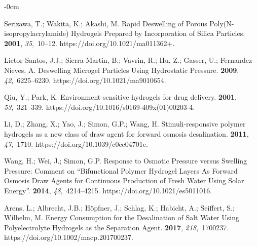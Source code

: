 \documentclass[gels,article,accept,pdftex,moreauthors]{Definitions/mdpi}
\begin{document}
\begin{adjustwidth}{-\extralength}{0cm}
\begin{thebibliography}{999}
Serizawa, T.; Wakita, K.; Akashi, M.
\newblock Rapid Deswelling of Porous Poly(N-isopropylacrylamide) Hydrogels
  Prepared by Incorporation of Silica Particles.
 {\bf 2001}, {\em 35},~10--12.
\newblock
  https://doi.org/10.1021/ma011362+.%

Lietor-Santos, J.J.; Sierra-Martin, B.; Vavrin, R.; Hu, Z.; Gasser, U.;
  Fernandez-Nieves, A.
\newblock Deswelling Microgel Particles Using Hydrostatic Pressure.
 {\bf 2009}, {\em 42},~6225--6230.
\newblock
  https://doi.org/10.1021/ma9010654.%

Qiu, Y.; Park, K.
\newblock Environment-sensitive hydrogels for drug delivery.
 {\bf 2001}, {\em 53},~321--339.
\newblock
  https://doi.org/10.1016/s0169-409x(01)00203-4.%

Li, D.; Zhang, X.; Yao, J.; Simon, G.P.; Wang, H.
\newblock Stimuli-responsive polymer hydrogels as a new class of draw agent for
  forward osmosis desalination.
 {\bf 2011}, {\em 47},~1710.
\newblock
  https://doi.org/10.1039/c0cc04701e.%

Wang, H.; Wei, J.; Simon, G.P.
\newblock Response to Osmotic Pressure versus Swelling Pressure: Comment on
  {\textquotedblleft}Bifunctional Polymer Hydrogel Layers As Forward Osmosis
  Draw Agents for Continuous Production of Fresh Water Using Solar
  Energy{\textquotedblright}.
 {\bf 2014}, {\em
  48},~4214--4215.
\newblock
  https://doi.org/10.1021/es5011016.%

Arens, L.; Albrecht, J.B.; Höpfner, J.; Schlag, K.; Habicht, A.; Seiffert, S.;
  Wilhelm, M.
\newblock Energy Consumption for the Desalination of Salt Water Using
  Polyelectrolyte Hydrogels as the Separation Agent.
 {\bf 2017}, {\em 218},~1700237.
\newblock
  https://doi.org/10.1002/macp.201700237.%


\end{thebibliography}
\end{adjustwidth}
\end{document}
